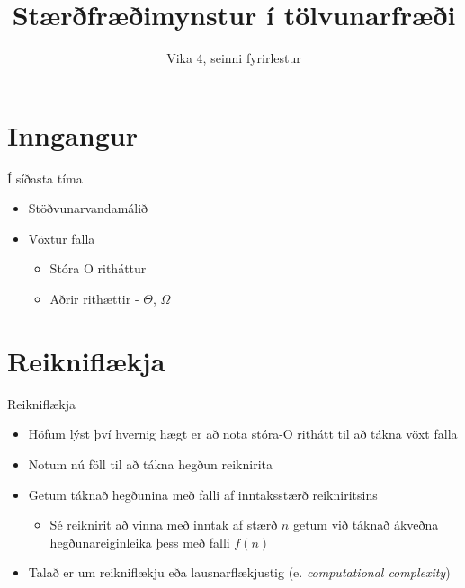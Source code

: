 \documentclass[handout]{beamer}
\title{Stærðfræðimynstur í tölvunarfræði}
\subtitle{Vika 4, seinni fyrirlestur}
\begin{document}
\begin{frame}
\titlepage
\end{frame}


\section{Inngangur}

\begin{frame}{Í síðasta tíma}
\begin{itemize}
 \item Stöðvunarvandamálið
 \item Vöxtur falla
 \begin{itemize}
  \item Stóra O ritháttur
  \item Aðrir rithættir - $\Theta$, $\Omega$
 \end{itemize}
\end{itemize}
\end{frame}

\section{Reikniflækja}

\begin{frame}{Reikniflækja}
\begin{itemize}
 \item Höfum lýst því hvernig hægt er að nota stóra-O rithátt til að tákna vöxt falla
 \item Notum nú föll til að tákna hegðun reiknirita
 \item Getum táknað hegðunina með falli af inntaksstærð reikniritsins
 \begin{itemize}
  \item Sé reiknirit að vinna með inntak af stærð $n$ getum við táknað ákveðna hegðunareiginleika þess með falli $f(n)$
 \end{itemize}
 \item Talað er um reikniflækju eða lausnarflækjustig (e. \emph{computational complexity})
\end{itemize}
\end{frame}
\end{document}
